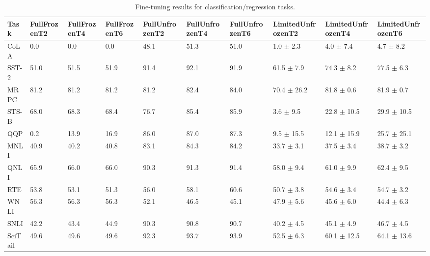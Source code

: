 \begin{table*}[ht]
\centering
\begin{adjustbox}{max width=\textwidth}
 \begin{tabular}{ l  l l l | l l l | l l l}
\toprule
\textbf{Task} & FullFrozenT2 & FullFrozenT4 & FullFrozenT6 & FullUnfrozenT2 & FullUnfrozenT4 & FullUnfrozenT6 & LimitedUnfrozenT2 & LimitedUnfrozenT4 & LimitedUnfrozenT6 \\
\midrule
CoLA & 0.0 & 0.0 & 0.0 & 48.1 & 51.3 & 51.0 & 1.0 $\pm$ 2.3 & 4.0 $\pm$ 7.4 & 4.7 $\pm$ 8.2\\
SST-2 & 51.0 & 51.5 & 51.9 & 91.4 & 92.1 & 91.9 & 61.5 $\pm$ 7.9 & 74.3 $\pm$ 8.2 & 77.5 $\pm$ 6.3\\
MRPC & 81.2 & 81.2 & 81.2 & 81.2 & 82.4 & 84.0 & 70.4 $\pm$ 26.2 & 81.8 $\pm$ 0.6 & 81.9 $\pm$ 0.7\\
STS-B & 68.0 & 68.3 & 68.4 & 76.7 & 85.4 & 85.9 & 3.6 $\pm$ 9.5 & 22.8 $\pm$ 10.5 & 29.9 $\pm$ 10.5\\
QQP & 0.2 & 13.9 & 16.9 & 86.0 & 87.0 & 87.3 & 9.5 $\pm$ 15.5 & 12.1 $\pm$ 15.9 & 25.7 $\pm$ 25.1\\
MNLI & 40.9 & 40.2 & 40.8 & 83.1 & 84.3 & 84.2 & 33.7 $\pm$ 3.1 & 37.5 $\pm$ 3.4 & 38.7 $\pm$ 3.2\\
QNLI & 65.9 & 66.0 & 66.0 & 90.3 & 91.3 & 91.4 & 58.0 $\pm$ 9.4 & 61.0 $\pm$ 9.9 & 62.4 $\pm$ 9.5\\
RTE & 53.8 & 53.1 & 51.3 & 56.0 & 58.1 & 60.6 & 50.7 $\pm$ 3.8 & 54.6 $\pm$ 3.4 & 54.7 $\pm$ 3.2\\
WNLI & 56.3 & 56.3 & 56.3 & 52.1 & 46.5 & 45.1 & 47.9 $\pm$ 5.6 & 45.6 $\pm$ 6.0 & 44.4 $\pm$ 6.3\\
SNLI & 42.2 & 43.4 & 44.9 & 90.3 & 90.8 & 90.7 & 40.2 $\pm$ 4.5 & 45.1 $\pm$ 4.9 & 46.7 $\pm$ 4.5\\
SciTail & 49.6 & 49.6 & 49.6 & 92.3 & 93.7 & 93.9 & 52.5 $\pm$ 6.3 & 60.1 $\pm$ 12.5 & 64.1 $\pm$ 13.6\\
\bottomrule
 \end{tabular}
 \end{adjustbox}
  \caption{Fine-tuning results for classification/regression tasks.}
  \label{tbla1}
\end{table*}
